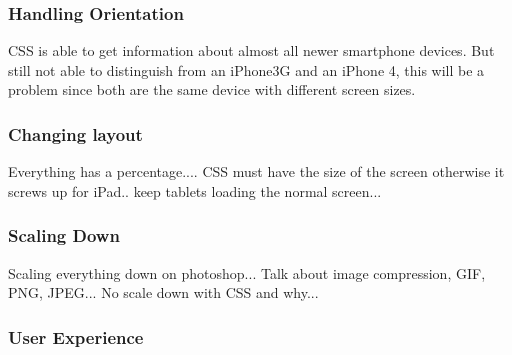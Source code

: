 \subsubsection{Handling Orientation}  %
CSS is able to get information about almost all newer smartphone devices. But still not able to distinguish from an iPhone3G and an iPhone 4, this will be a problem since both are the same device with different screen sizes.\\

\subsubsection{Changing layout}	    %
Everything has a percentage....
CSS must have the size of the screen otherwise it screws up for iPad.. keep tablets loading the normal screen...
\subsubsection{Scaling Down}		    %
Scaling everything down on photoshop...
Talk about image compression, GIF, PNG, JPEG...
No scale down with CSS and why...

\subsubsection{User Experience}	    %


